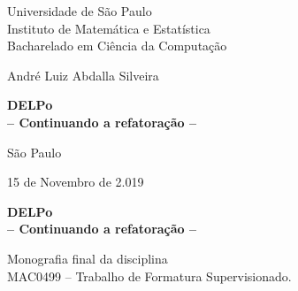\documentclass[12pt,twoside,a4paper,openany]{book}
\begin{document}
    \frontmatter
    \fancyhead[RO]{{\footnotesize\rightmark}\hspace{2em}\thepage}
    \setcounter{tocdepth}{2}
    \fancyhead[LE]{\thepage\hspace{2em}\footnotesize{\leftmark}}
    \fancyhead[RE,LO]{}
    \fancyhead[RO]{{\footnotesize\rightmark}\hspace{2em}\thepage}

    \onehalfspacing  %


    \thispagestyle{empty}
    \begin{center}
        \vspace*{2.3cm}
        Universidade de São Paulo\\
        Instituto de Matemática e Estatística \\
        Bacharelado  em Ciência da Computação


        \vspace*{3cm}
        \Large{André Luiz Abdalla Silveira}


        \vspace{3cm}
        \textbf{\Large{DELPo \\
             -- Continuando a refatoração --}}


        \vskip 5cm
        \normalsize{São Paulo}

        \normalsize{15 de Novembro de 2.019}
    \end{center}
    \newpage
    \thispagestyle{empty}
    \begin{center}
        \vspace*{2.3 cm}
        \textbf{\Large{DELPo \\
        -- Continuando a refatoração --}}
        \vspace*{2 cm}
    \end{center}

    \vskip 2cm

    \begin{flushright}
        Monografia final da disciplina \\
        MAC0499 -- Trabalho de Formatura Supervisionado.
    \end{flushright}

    \vskip 5cm
\end{document}
